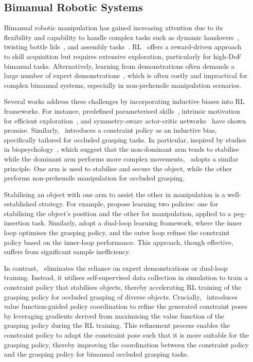 \subsection{Bimanual Robotic Systems}
Bimanual robotic manipulation has gained increasing attention due to its flexibility and capability to handle complex tasks such as dynamic handovers~\cite{huang2023dynamic}, twisting bottle lids~\cite{lin2024twisting}, and assembly tasks~\cite{drolet2024comparison, shao2020learning}. 
RL~\cite{haarnoja2018soft, schulman2017proximalpolicyoptimizationalgorithms} offers a reward-driven approach to skill acquisition but requires extensive exploration, particularly for high-DoF bimanual tasks. 
Alternatively, learning from demonstrations often demands a large number of expert demonstrations~\cite{zhao2024alohaunleashedsimplerecipe}, which is often costly and impractical for complex bimanual systems, especially in non-prehensile manipulation scenarios.

Several works address these challenges by incorporating inductive biases into RL frameworks. For instance, predefined parameterised skills~\cite{chitnis2020efficient}, intrinsic motivation for efficient exploration~\cite{Chitnis2020Intrinsic}, and symmetry-aware actor-critic networks~\cite{li2023efficient} have shown promise. 
Similarly, \ourmethod~introduces a constraint policy as an inductive bias, specifically tailored for occluded grasping tasks.
In particular, inspired by studies in biopsychology~\cite{Sainburg2001EvidenceFA, bagesteiro2002handedness, bagesteiro2003}, which suggest that the non-dominant arm tends to stabilise while the dominant arm performs more complex movements, \ourmethod~adopts a similar principle. 
One arm is used to stabilise and secure the object, while the other performs non-prehensile manipulation for occluded grasping.

Stabilising an object with one arm to assist the other in manipulation is a well-established strategy. 
For example, \citet{grannen2023stabilize} propose learning two policies: one for stabilising the object’s position and the other for manipulation, applied to a peg-insertion task. 
Similarly, \citet{shao2020learning} adopt a dual-loop learning framework, where the inner loop optimises the grasping policy, and the outer loop refines the constraint policy based on the inner-loop performance. This approach, though effective, suffers from significant sample inefficiency.



In contrast, \ourmethod~eliminates the reliance on expert demonstrations or dual-loop training. Instead, it utilises self-supervised data collection in simulation to train a constraint policy that stabilises objects, thereby accelerating RL training of the grasping policy for occluded grasping of diverse objects. 
Crucially, \ourmethod~introduces value function-guided policy coordination to refine the generated constraint poses by leveraging gradients derived from maximising the value function of the grasping policy during the RL training. 
This refinement process enables the constraint policy to adapt the constraint pose such that it is more suitable for the grasping policy, thereby improving the coordination between the constraint policy and the grasping policy for bimanual occluded grasping tasks.